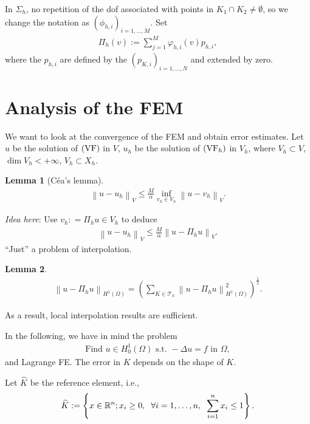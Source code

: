 \documentclass[11pt,a4paper,center,notitlepage]{article}
\numberwithin{equation}{section}
\newtheorem{lemma}{Lemma}[section]
\begin{document}
In $\Sigma _h$, no repetition of the dof associated with points in ${K_1} \cap {K_2} \ne \emptyset $, so we change the notation as $\left(\phi _{h,i}\right) _{i=1,\ldots,M}$. Set
\begin{align}
{\Pi _h}\left( v \right) := \sum\limits_{j = 1}^M {{\varphi _{h,i}}\left( v \right){p_{h,i}}} ,
\end{align}
where the $p_{h,i}$ are defined by the $\left(p_{K,i}\right)_{i=1,\ldots,N}$ and extended by zero.

\section{Analysis of the FEM}
We want to look at the convergence of the FEM and obtain error estimates. Let $u$ be the solution of $\left({\rm VF}\right)$ in $V$, $u_h$ be the solution of $\left({\rm VF}_h\right)$ in $V_h$, where $V_h\subset V$, $\dim V_h <+\infty$, $V_h \subset X_h$. 
\begin{lemma}[C\'ea's lemma]
\begin{align}
{\left\| {u - {u_h}} \right\|_V} \le \frac{M}{\alpha }\mathop {\inf }\limits_{{v_h} \in {V_h}} {\left\| {u - {v_h}} \right\|_V}.
\end{align}
\end{lemma}
\noindent
\textit{Idea here}: Use ${v_h}: = {\Pi _h}u \in {V_h}$ to deduce
\begin{align}
{\left\| {u - {u_h}} \right\|_V} \le \frac{M}{\alpha }{\left\| {u - {\Pi _h}u} \right\|_V}.
\end{align}
``Just'' a problem of interpolation.

\begin{lemma}
\begin{align}
{\left\| {u - {\Pi _h}u} \right\|_{{H^1}\left( \Omega  \right)}} = {\left( {\sum\limits_{K \in {\mathcal{T}_h}} {\left\| {u - {\Pi _h}u} \right\|_{{H^1}\left( \Omega  \right)}^2} } \right)^{\frac{1}{2}}} .
\end{align}
\end{lemma}
As a result, local interpolation results are sufficient.

In the following, we have in mind the problem 
\begin{align}
\mbox{Find }u \in H_0^1\left( \Omega  \right) \mbox{ s.t. }- \Delta u = f \mbox{ in } \Omega ,
\end{align}
and Lagrange FE. The error in $K$ depends on the shape of $K$. 

Let $\widehat{K}$ be the reference element, i.e.,
\begin{align}
\widehat K: = \left\{ {x \in {\mathbb{R}^n};{x_i} \ge 0,\hspace{2mm}\forall i = 1, \ldots ,n,\hspace{2mm}\sum\limits_{i = 1}^n {{x_i}}  \le 1} \right\}.
\end{align}
\end{document}
